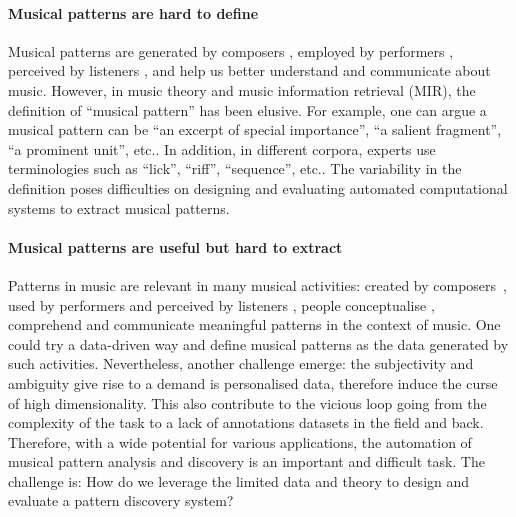 \documentclass[acmsmall,review,anonymous]{acmart}\settopmatter{printfolios=true,printccs=false,printacmref=false}
\begin{document}
\paragraph{Musical patterns are hard to define}
Musical patterns are generated by composers \cite{}, employed by performers
\cite{}, perceived by listeners \cite{}, and help us better understand and
communicate about music. However, in music theory and music
information retrieval (MIR), the definition of ``musical pattern'' has been
elusive. For example, one can argue a musical pattern can be ``an excerpt
of special importance'', ``a salient fragment'', ``a prominent unit'', etc.. In
addition, in different corpora, experts use terminologies such as ``lick'',
``riff'', ``sequence'', etc.. The variability in the definition poses
difficulties on designing and evaluating automated computational systems to extract musical patterns.

\paragraph{Musical patterns are useful but hard to extract} Patterns in music are relevant in many
musical activities: created by composers\ \cite{}, used by performers \cite{}
and perceived by listeners \cite{}, people conceptualise \cite{}, comprehend
\cite{} and communicate meaningful patterns in the context of music. One could
try a data-driven way and define musical patterns as the data generated by such
activities. Nevertheless, another challenge emerge: the subjectivity and
ambiguity give rise to a demand is personalised data, therefore induce the curse
of high dimensionality. This also contribute to the vicious loop going from the
complexity of the task to a lack of annotations datasets in the field and back.
Therefore, with a wide potential for various applications, the automation of
musical pattern analysis and discovery is an important and difficult task. The
challenge is: How do we leverage the limited data and theory to design
and evaluate a pattern discovery system?
\end{document}
